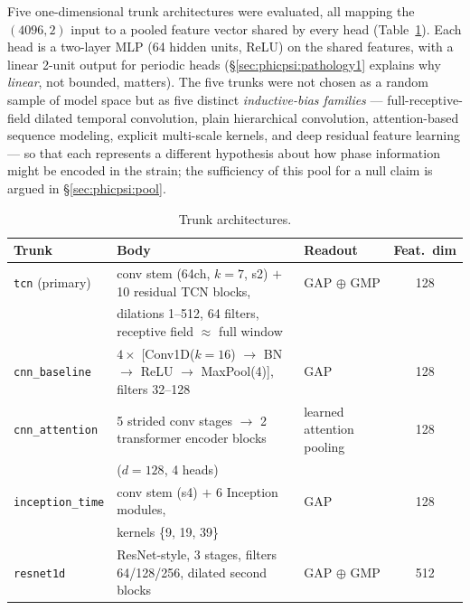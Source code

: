 Five one-dimensional trunk architectures were evaluated, all mapping the $(4096, 2)$ input to a pooled feature vector shared by every head (Table~\ref{tab:phicpsi:trunks}).
Each head is a two-layer MLP (64 hidden units, ReLU) on the shared features, with a linear 2-unit output for periodic heads (\S\ref{sec:phicpsi:pathology1} explains why \emph{linear}, not bounded, matters).
The five trunks were not chosen as a random sample of model space but as five distinct \emph{inductive-bias families} --- full-receptive-field dilated temporal convolution, plain hierarchical convolution, attention-based sequence modeling, explicit multi-scale kernels, and deep residual feature learning --- so that each represents a different hypothesis about how phase information might be encoded in the strain; the sufficiency of this pool for a null claim is argued in \S\ref{sec:phicpsi:pool}.

\begin{table}[tbp]
    \centering
    \caption{Trunk architectures.}
    \label{tab:phicpsi:trunks}
    \small
    \begin{tabular}{@{}lllc@{}}
        \toprule
        Trunk                    & Body                                                                      & Readout           & Feat.\ dim \\
        \midrule
        \texttt{tcn} (primary)   & conv stem (64ch, $k{=}7$, s2) $+$ 10 residual TCN blocks, & GAP $\oplus$ GMP & 128 \\
        & dilations 1--512, 64 filters, receptive field $\approx$ full window~\cite{bai2018tcn} &                   &            \\
        \texttt{cnn\_baseline}   & $4\times$ [Conv1D($k{=}16$) $\to$ BN $\to$ ReLU $\to$ MaxPool(4)], filters 32--128 & GAP & 128 \\
        \texttt{cnn\_attention}  & 5 strided conv stages $\to$ 2 transformer encoder blocks                  & learned attention pooling & 128 \\
        & ($d{=}128$, 4 heads)~\cite{vaswani2017attention}                          &                   &            \\
        \texttt{inception\_time} & conv stem (s4) $+$ 6 Inception modules,                                   & GAP               & 128        \\
        & kernels \{9, 19, 39\}~\cite{fawaz2019inceptiontime}                       &                   &            \\
        \texttt{resnet1d}        & ResNet-style, 3 stages, filters 64/128/256, dilated second blocks~\cite{he2016resnet} & GAP $\oplus$ GMP & 512 \\
        \bottomrule
    \end{tabular}
\end{table}

